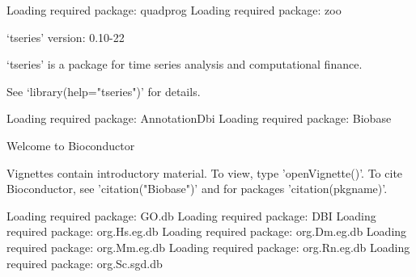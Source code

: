 Loading required package: quadprog
Loading required package: zoo

    ‘tseries’ version: 0.10-22

    ‘tseries’ is a package for time series analysis and computational
    finance.

    See ‘library(help="tseries")’ for details.

Loading required package: AnnotationDbi
Loading required package: Biobase

Welcome to Bioconductor

  Vignettes contain introductory material. To view, type
  'openVignette()'. To cite Bioconductor, see
  'citation("Biobase")' and for packages 'citation(pkgname)'.

Loading required package: GO.db
Loading required package: DBI
Loading required package: org.Hs.eg.db
Loading required package: org.Dm.eg.db
Loading required package: org.Mm.eg.db
Loading required package: org.Rn.eg.db
Loading required package: org.Sc.sgd.db
